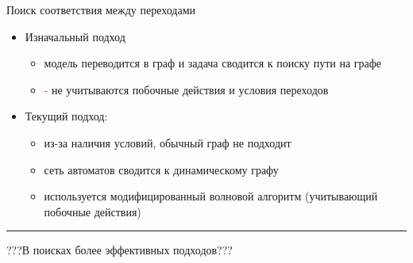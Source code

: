 \documentclass[12pt]{beamer}
\begin{document}
{
\begin{frame}{Поиск соответствия между переходами}
  \begin{mybox}[]
  \begin{itemize}
   	\item Изначальный подход 
   	\begin{itemize}
   	\item модель переводится в граф и задача сводится к поиску пути на графе
   	\item \textcolor{red}{-} не учитываются побочные действия и условия переходов
   	\end{itemize}
   	
    \item Текущий подход: 
    \begin{itemize}
    \item из-за наличия условий, обычный граф не подходит
    \item сеть автоматов сводится к динамическому графу 
    \item используется модифицированный волновой алгоритм (учитывающий побочные действия)
    \end{itemize}
  \end{itemize}
  \end{mybox}
  \noindent\rule{4cm}{0.4pt}
  \begin{mybox}[]
  	???В поисках более эффективных подходов???
  \end{mybox}
  
\end{frame}
}
\end{document}
